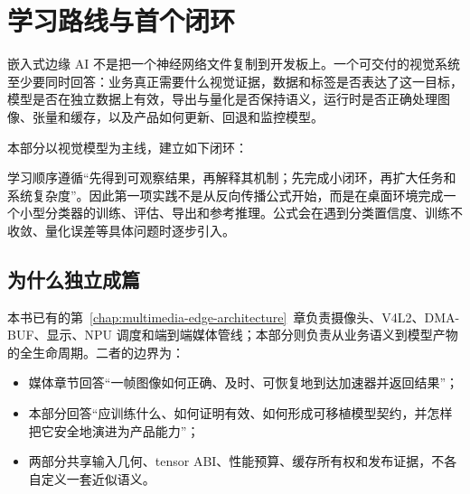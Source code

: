 \chapter{学习路线与首个闭环}
\label{chap:edge-ai-learning-roadmap}

嵌入式边缘 AI 不是把一个神经网络文件复制到开发板上。一个可交付的视觉系统至少要同时回答：业务真正需要什么视觉证据，数据和标签是否表达了这一目标，模型是否在独立数据上有效，导出与量化是否保持语义，运行时是否正确处理图像、张量和缓存，以及产品如何更新、回退和监控模型。

本部分以视觉模型为主线，建立如下闭环：

\begin{center}
\end{center}

学习顺序遵循“先得到可观察结果，再解释其机制；先完成小闭环，再扩大任务和系统复杂度”。因此第一项实践不是从反向传播公式开始，而是在桌面环境完成一个小型分类器的训练、评估、导出和参考推理。公式会在遇到分类置信度、训练不收敛、量化误差等具体问题时逐步引入。

\section{为什么独立成篇}

本书已有的第~\ref{chap:multimedia-edge-architecture}~章负责摄像头、V4L2、DMA-BUF、显示、NPU 调度和端到端媒体管线；本部分则负责从业务语义到模型产物的全生命周期。二者的边界为：

\begin{itemize}
  \item 媒体章节回答“一帧图像如何正确、及时、可恢复地到达加速器并返回结果”；
  \item 本部分回答“应训练什么、如何证明有效、如何形成可移植模型契约，并怎样把它安全地演进为产品能力”；
  \item 两部分共享输入几何、tensor ABI、性能预算、缓存所有权和发布证据，不各自定义一套近似语义。
\end{itemize}

